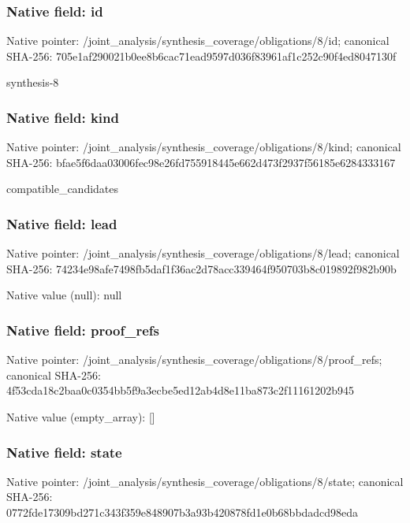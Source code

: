 \documentclass[10pt,a4paper]{article}
\begin{document}
\subsubsection{Native field: id}
Native pointer: /joint\_\allowbreak{}analysis/synthesis\_\allowbreak{}coverage/obligations/8/id; canonical SHA-256: 705e1af290021b0ee8b6cac71ead9597d036f83961af1c252c90f4ed8047130f

\begingroup\raggedright\sloppy synthesis-8\par\endgroup

\subsubsection{Native field: kind}
Native pointer: /joint\_\allowbreak{}analysis/synthesis\_\allowbreak{}coverage/obligations/8/kind; canonical SHA-256: bfae5f6daa03006fec98e26fd755918445e662d473f2937f56185e6284333167

\begingroup\raggedright\sloppy compatible\_\allowbreak{}candidates\par\endgroup

\subsubsection{Native field: lead}
Native pointer: /joint\_\allowbreak{}analysis/synthesis\_\allowbreak{}coverage/obligations/8/lead; canonical SHA-256: 74234e98afe7498fb5daf1f36ac2d78acc339464f950703b8c019892f982b90b

Native value (null): null

\subsubsection{Native field: proof\_\allowbreak{}refs}
Native pointer: /joint\_\allowbreak{}analysis/synthesis\_\allowbreak{}coverage/obligations/8/proof\_\allowbreak{}refs; canonical SHA-256: 4f53cda18c2baa0c0354bb5f9a3ecbe5ed12ab4d8e11ba873c2f11161202b945

Native value (empty\_\allowbreak{}array): []

\subsubsection{Native field: state}
Native pointer: /joint\_\allowbreak{}analysis/synthesis\_\allowbreak{}coverage/obligations/8/state; canonical SHA-256: 0772fde17309bd271c343f359e848907b3a93b420878fd1e0b68bbdadcd98eda
\end{document}
